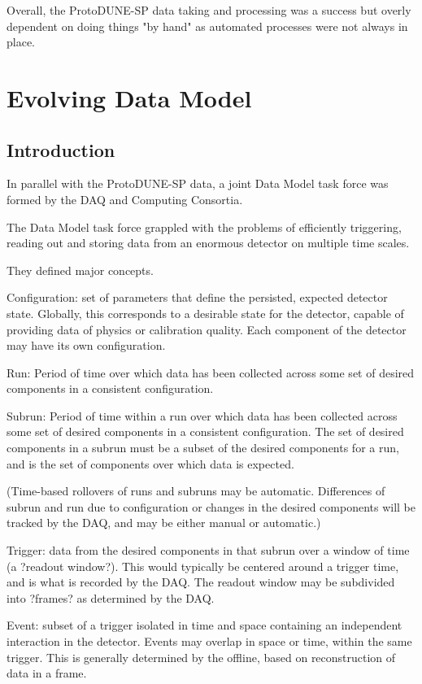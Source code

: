 Overall, the ProtoDUNE-SP data taking and processing was a success but overly dependent on doing things "by hand" as automated processes were not always in place. 






\section{Evolving Data Model}		
\label{ch:exec-comp-mod}

\subsection{Introduction}	
\label{ch:exec-comp-mod-int}
In parallel with the ProtoDUNE-SP data, a joint Data Model task force was formed by the DAQ and Computing Consortia. 

The Data Model task force grappled with the problems of efficiently triggering, reading out and storing data from an enormous detector on multiple time scales.

They defined major concepts.

\begin{description}

\item{Configuration:} set of parameters that define the persisted, expected detector state. Globally, this corresponds to a desirable state for the detector, capable of providing data of physics or calibration quality. Each component of the detector may have its own configuration.
 
\item{Run:} Period of time over which data has been collected across some set of desired components in a consistent configuration.
 
\item{Subrun:} Period of time within a run over which data has been collected across some set of desired components in a consistent configuration. The set of desired components in a subrun must be a subset of the desired components for a run, and is the set of components over which data is expected.
 
(Time-based rollovers of runs and subruns may be automatic. Differences of subrun and run due to configuration or changes in the desired components will be tracked by the DAQ, and may be either manual or automatic.)
 
\item{Trigger:} data from the desired components in that subrun over a window of time (a ?readout window?). This would typically be centered around a trigger time, and is what is recorded by the DAQ. The readout window may be subdivided into ?frames? as determined by the DAQ.
 
\item{Event:} subset of a trigger isolated in time and space containing an independent interaction in the detector. Events may overlap in space or time, within the same trigger. This is generally determined by the offline, based on reconstruction of data in a frame.

\end{description}

